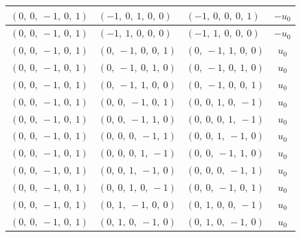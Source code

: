 \documentclass[11pt]{article}
\theoremstyle{definition}
\begin{document}
\begin{longtable}{|l|l|l|c|}
    \hline
    $\left( 0, \  0, \  -1, \  0, \  1\right)$ & $\left( -1, \  0, \  1, \  0, \  0\right)$ & $\left( -1, \  0, \  0, \  0, \  1\right)$ & $- u_{0}$ \\
    \hline
    $\left( 0, \  0, \  -1, \  0, \  1\right)$ & $\left( -1, \  1, \  0, \  0, \  0\right)$ & $\left( -1, \  1, \  0, \  0, \  0\right)$ & $- u_{0}$ \\
    \hline
    $\left( 0, \  0, \  -1, \  0, \  1\right)$ & $\left( 0, \  -1, \  0, \  0, \  1\right)$ & $\left( 0, \  -1, \  1, \  0, \  0\right)$ & $u_{0}$ \\
    \hline
    $\left( 0, \  0, \  -1, \  0, \  1\right)$ & $\left( 0, \  -1, \  0, \  1, \  0\right)$ & $\left( 0, \  -1, \  0, \  1, \  0\right)$ & $u_{0}$ \\
    \hline
    $\left( 0, \  0, \  -1, \  0, \  1\right)$ & $\left( 0, \  -1, \  1, \  0, \  0\right)$ & $\left( 0, \  -1, \  0, \  0, \  1\right)$ & $u_{0}$ \\
    \hline
    $\left( 0, \  0, \  -1, \  0, \  1\right)$ & $\left( 0, \  0, \  -1, \  0, \  1\right)$ & $\left( 0, \  0, \  1, \  0, \  -1\right)$ & $u_{0}$ \\
    \hline
    $\left( 0, \  0, \  -1, \  0, \  1\right)$ & $\left( 0, \  0, \  -1, \  1, \  0\right)$ & $\left( 0, \  0, \  0, \  1, \  -1\right)$ & $u_{0}$ \\
    \hline
    $\left( 0, \  0, \  -1, \  0, \  1\right)$ & $\left( 0, \  0, \  0, \  -1, \  1\right)$ & $\left( 0, \  0, \  1, \  -1, \  0\right)$ & $u_{0}$ \\
    \hline
    $\left( 0, \  0, \  -1, \  0, \  1\right)$ & $\left( 0, \  0, \  0, \  1, \  -1\right)$ & $\left( 0, \  0, \  -1, \  1, \  0\right)$ & $u_{0}$ \\
    \hline
    $\left( 0, \  0, \  -1, \  0, \  1\right)$ & $\left( 0, \  0, \  1, \  -1, \  0\right)$ & $\left( 0, \  0, \  0, \  -1, \  1\right)$ & $u_{0}$ \\
    \hline
    $\left( 0, \  0, \  -1, \  0, \  1\right)$ & $\left( 0, \  0, \  1, \  0, \  -1\right)$ & $\left( 0, \  0, \  -1, \  0, \  1\right)$ & $u_{0}$ \\
    \hline
    $\left( 0, \  0, \  -1, \  0, \  1\right)$ & $\left( 0, \  1, \  -1, \  0, \  0\right)$ & $\left( 0, \  1, \  0, \  0, \  -1\right)$ & $u_{0}$ \\
    \hline
    $\left( 0, \  0, \  -1, \  0, \  1\right)$ & $\left( 0, \  1, \  0, \  -1, \  0\right)$ & $\left( 0, \  1, \  0, \  -1, \  0\right)$ & $u_{0}$ \\

\end{longtable}
\end{document}

